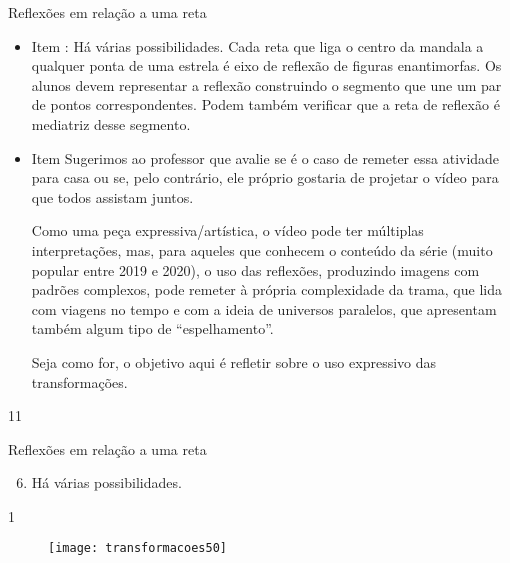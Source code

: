 \begin{sugestions}{Reflexões em relação a uma reta}
{
\begin{itemize}
\item Item : Há várias possibilidades. Cada reta que liga o centro da mandala a qualquer ponta de uma estrela é eixo de reflexão de figuras enantimorfas. Os alunos devem representar a reflexão construindo o segmento que une um par de pontos correspondentes. Podem também verificar que a reta de reflexão é mediatriz desse segmento. 

\item Item  Sugerimos ao professor que avalie se é o caso de remeter essa atividade para casa ou se, pelo contrário, ele próprio gostaria de projetar o vídeo para que todos assistam juntos. 

Como uma peça expressiva/artística, o vídeo pode ter múltiplas interpretações, mas, para aqueles que conhecem o conteúdo da série (muito popular entre 2019 e 2020), o uso das reflexões, produzindo imagens com padrões complexos, pode remeter à própria complexidade da trama, que lida com viagens no tempo e com a ideia de universos paralelos, que apresentam também algum tipo de “espelhamento”. 

Seja como for, o objetivo aqui é refletir sobre o uso expressivo das transformações.
\end{itemize}
}{1}{1}
\end{sugestions}
\begin{answer}{Reflexões em relação a uma reta}
{\begin{enumerate}\setcounter{enumi}{5}
\item Há várias possibilidades.
\end{enumerate}
}{1}
\end{answer}

\begin{figure}[H]
\centering

\texttt{[image: transformacoes50]}
\caption{}
\label{transformacoes50}
\end{figure}

